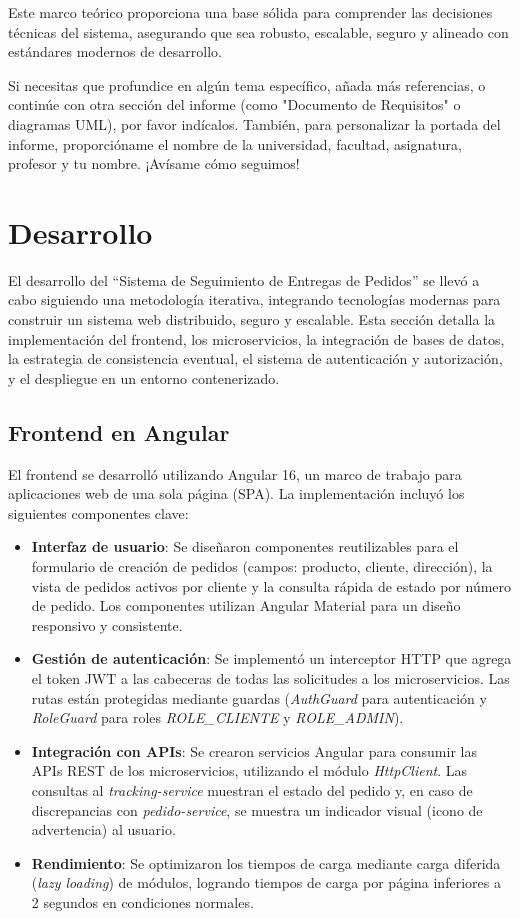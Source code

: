 \documentclass[a4paper,12pt]{article}
\begin{document}
Este marco teórico proporciona una base sólida para comprender las decisiones técnicas del sistema, asegurando que sea robusto, escalable, seguro y alineado con estándares modernos de desarrollo.

Si necesitas que profundice en algún tema específico, añada más referencias, o continúe con otra sección del informe (como "Documento de Requisitos" o diagramas UML), por favor indícalos. También, para personalizar la portada del informe, proporcióname el nombre de la universidad, facultad, asignatura, profesor y tu nombre. ¡Avísame cómo seguimos!

\section{Desarrollo}

El desarrollo del ``Sistema de Seguimiento de Entregas de Pedidos'' se llevó a cabo siguiendo una metodología iterativa, integrando tecnologías modernas para construir un sistema web distribuido, seguro y escalable. Esta sección detalla la implementación del frontend, los microservicios, la integración de bases de datos, la estrategia de consistencia eventual, el sistema de autenticación y autorización, y el despliegue en un entorno contenerizado.

\subsection{Frontend en Angular}
El frontend se desarrolló utilizando Angular 16, un marco de trabajo para aplicaciones web de una sola página (SPA). La implementación incluyó los siguientes componentes clave:

\begin{itemize}
    \item \textbf{Interfaz de usuario}: Se diseñaron componentes reutilizables para el formulario de creación de pedidos (campos: producto, cliente, dirección), la vista de pedidos activos por cliente y la consulta rápida de estado por número de pedido. Los componentes utilizan Angular Material para un diseño responsivo y consistente.
    \item \textbf{Gestión de autenticación}: Se implementó un interceptor HTTP que agrega el token JWT a las cabeceras de todas las solicitudes a los microservicios. Las rutas están protegidas mediante guardas (\textit{AuthGuard} para autenticación y \textit{RoleGuard} para roles \textit{ROLE\_CLIENTE} y \textit{ROLE\_ADMIN}).
    \item \textbf{Integración con APIs}: Se crearon servicios Angular para consumir las APIs REST de los microservicios, utilizando el módulo \textit{HttpClient}. Las consultas al \textit{tracking-service} muestran el estado del pedido y, en caso de discrepancias con \textit{pedido-service}, se muestra un indicador visual (icono de advertencia) al usuario.
    \item \textbf{Rendimiento}: Se optimizaron los tiempos de carga mediante carga diferida (\textit{lazy loading}) de módulos, logrando tiempos de carga por página inferiores a 2 segundos en condiciones normales.
\end{itemize}
\end{document}
